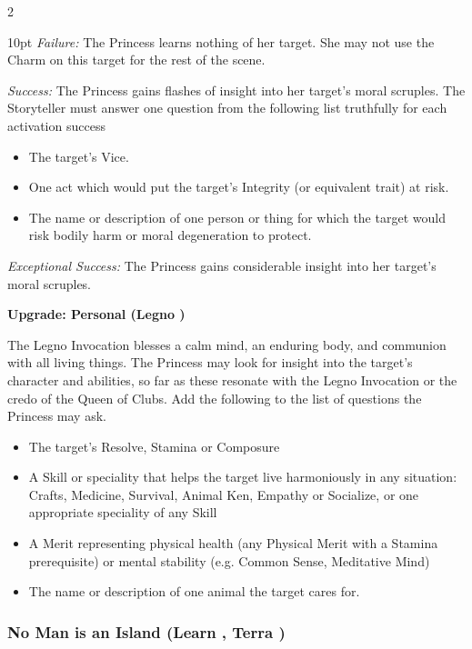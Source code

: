 \begin{multicols}{2}
\begin{myindentpar}{10pt}
\emph{Failure:} The Princess learns nothing of her target. She may not use the Charm on this target for the rest of the scene.

\emph{Success:} The Princess gains flashes of insight into her target's moral scruples. The Storyteller must answer one question from the following list truthfully for each activation success

\begin{itemize}
\item The target's Vice.
\item One act which would put the target's Integrity (or equivalent trait) at risk.
\item The name or description of one person or thing for which the target would risk bodily harm or moral degeneration to protect.
\end{itemize}

\emph{Exceptional Success:} The Princess gains considerable insight into her target's moral scruples.

\textbf{Upgrade: Personal (Legno \textbullet\textbullet)}

The Legno Invocation blesses a calm mind, an enduring body, and communion with all living things. The Princess may look for insight into the target's character and abilities, so far as these resonate with the Legno Invocation or the credo of the Queen of Clubs. Add the following to the list of questions the Princess may ask.

\begin{itemize}
 \item  The target's Resolve, Stamina or Composure
\item A Skill or speciality that helps the target live harmoniously in any situation: Crafts, Medicine, Survival, Animal Ken, Empathy or Socialize, or one appropriate speciality of any Skill
\item A Merit representing physical health (any Physical Merit with a Stamina prerequisite) or mental stability (e.g. Common Sense, Meditative Mind)
\item The name or description of one animal the target cares for.\end{itemize}\end{myindentpar}

\subsubsection*{No Man is an Island (Learn \textbullet\textbullet, Terra \textbullet)}


\end{multicols}

